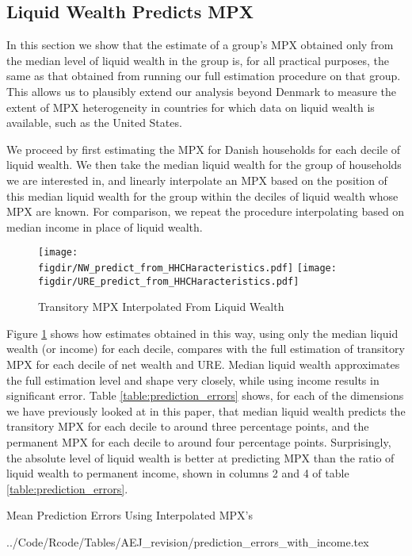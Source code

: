 \documentclass[titlepage]{\econtex}\newcommand{\texname}{ConsumptionHeterogeneity}
\newcommand{\figdir}{../Code/Rcode/Figures/AEJ_revision}
\newcommand{\tabdir}{../Code/Rcode/Tables/AEJ_revision}
\begin{document}
	\subsection{Liquid Wealth Predicts MPX}
	\label{liquid_wealth_sufficient}
	In this section we show that the estimate of a group's MPX obtained only from the median level of liquid wealth in the group is, for all practical purposes, the same as that obtained from running our full estimation procedure on that group. This allows us to plausibly extend our analysis beyond Denmark to measure the extent of MPX heterogeneity in countries for which data on liquid wealth is available, such as the United States.
	
	We proceed by first estimating the MPX for Danish households for each decile of liquid wealth. We then take the median liquid wealth for the group of households we are interested in, and linearly interpolate an MPX based on the position of this median liquid wealth for the group within the deciles of liquid wealth whose MPX are known. For comparison, we repeat the procedure interpolating based on median income in place of liquid wealth.
	
	\begin{figure}
		\centering
		\texttt{[image: \\figdir/NW\_predict\_from\_HHCHaracteristics.pdf]}
		\centering
		\texttt{[image: \\figdir/URE\_predict\_from\_HHCHaracteristics.pdf]}
		\caption{Transitory MPX Interpolated From Liquid Wealth}
		\label{fig:MPXPredict}
	\end{figure}
	
	Figure \ref{fig:MPXPredict} shows how estimates obtained in this way, using only the median liquid wealth (or income) for each decile, compares with the full estimation of transitory MPX for each decile of net wealth and URE. Median liquid wealth approximates the full estimation level and shape very closely, while using income results in significant error. Table \ref{table:prediction_errors} shows, for each of the dimensions we have previously looked at in this paper, that median liquid wealth predicts the transitory MPX for each decile to around three percentage points, and the permanent MPX for each decile to around four percentage points. Surprisingly, the absolute level of liquid wealth is better at predicting MPX than the ratio of liquid wealth to permanent income, shown in columns 2 and 4 of table \ref{table:prediction_errors}.
	
	\begin{center}
		\begin{table}
			\caption{Mean Prediction Errors Using Interpolated MPX's}
			\label{table:prediction_errors}
			\begin{center}
				 \tabdir/prediction_errors_with_income.tex
			\end{center}
		\end{table}
	\end{center}
	
\end{document}

